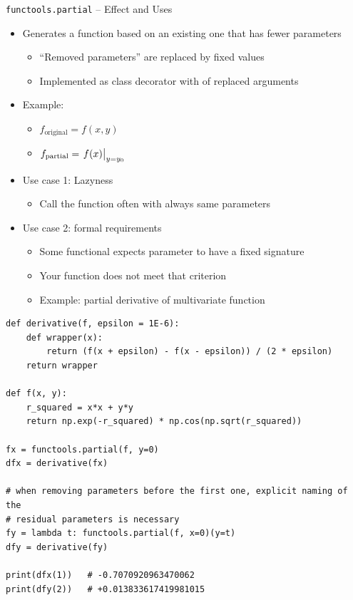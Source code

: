 \begin{frame}[fragile]{\texttt{functools.partial} -- Effect and Uses}
%
\begin{itemize}
\item Generates a function based on an existing one that has fewer parameters
	\begin{itemize}
	\item \enquote{Removed parameters} are replaced by fixed values
	\item Implemented as class decorator with  of replaced arguments
	\end{itemize}
\item Example:
	\begin{itemize}
	\item $f_{\text{original}} = f(x, y)$
	\item $f_{\text{partial}} = \eval{f(x)}_{y = y_0}$
	\end{itemize}
\item Use case 1: Lazyness
	\begin{itemize}
	\item Call the function often with always same parameters
	\end{itemize}
\item Use case 2: formal requirements
	\begin{itemize}
	\item Some functional expects parameter to have a fixed signature
	\item Your function does not meet that criterion
	\item Example: partial derivative of multivariate function
	\end{itemize}
\end{itemize}
%
\end{frame}


\begin{frame}[fragile]

\begin{codebox}
\begin{verbatim}
def derivative(f, epsilon = 1E-6):
    def wrapper(x):
        return (f(x + epsilon) - f(x - epsilon)) / (2 * epsilon)
    return wrapper

def f(x, y):
    r_squared = x*x + y*y
    return np.exp(-r_squared) * np.cos(np.sqrt(r_squared))

fx = functools.partial(f, y=0)
dfx = derivative(fx)

# when removing parameters before the first one, explicit naming of the
# residual parameters is necessary
fy = lambda t: functools.partial(f, x=0)(y=t)
dfy = derivative(fy)

print(dfx(1))   # -0.7070920963470062
print(dfy(2))   # +0.013833617419981015
\end{verbatim}
\end{codebox}
%
\end{frame}

